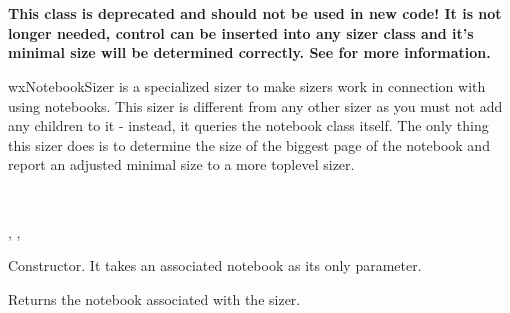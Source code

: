 \section{}\label{wxnotebooksizer}

{\bf This class is deprecated and should not be used in new code! It is not
longer needed,  control can be inserted
into any sizer class and it's minimal size will be determined correctly.
See  for more information.}

wxNotebookSizer is a specialized sizer to make sizers work in connection
with using notebooks. This sizer is different from any other sizer as 
you must not add any children to it - instead, it queries the notebook class itself.
The only thing this sizer does is to determine the size of the biggest
page of the notebook and report an adjusted minimal size to a more toplevel
sizer.


\\


, , 


\label{wxnotebooksizerwxnotebooksizer}


Constructor. It takes an associated notebook as its only parameter.

\label{wxnotebooksizergetnotebook}


Returns the notebook associated with the sizer.

